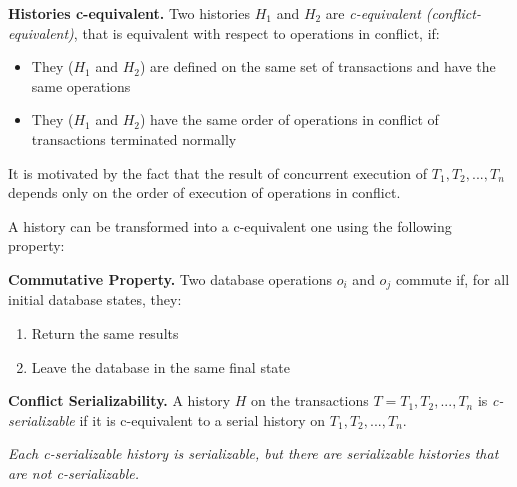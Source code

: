 \begin{tcolorbox}
\textbf{Histories c-equivalent.} Two histories $H_1$ and $H_2$ are \textit{c-equivalent (conflict-equivalent)}, that is equivalent with respect to operations in conflict, if:
\begin{itemize}
    \item They ($H_1$ and $H_2$) are defined on the same set of transactions and have the same operations
    \item They ($H_1$ and $H_2$) have the same order of operations in conflict of transactions terminated normally
\end{itemize}
\end{tcolorbox}
It is motivated by the fact that the result of concurrent execution of $T_1, T_2,...,T_n$ depends only on the order of execution of operations in conflict.

A history can be transformed into a c-equivalent one using the following property:
\begin{tcolorbox}
\textbf{Commutative Property.} Two database operations $o_i$ and $o_j$ commute if, for all initial database states, they:
\begin{enumerate}
    \item Return the same results
    \item Leave the database in the same final state
\end{enumerate}
\end{tcolorbox}

\begin{tcolorbox}
\textbf{Conflict Serializability.} A history $H$ on the transactions $T = {T_1, T_2,...,T_n}$ is \textit{c-serializable} if it is c-equivalent to a serial history on $T_1, T_2,...,T_n$.
\end{tcolorbox}
\textit{Each c-serializable history is serializable, but there are serializable histories that are not c-serializable.}

